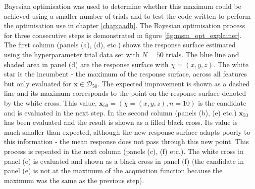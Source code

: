Bayesian optimisation was used to determine whether this maximum could be achieved using a smaller number of trials and to test the code written to perform the optimisation use in chapter \ref{chap:aadh}. The Bayesian optimisation process for three consecutive steps is demonstrated in figure \ref{fig:msm_opt_explainer}. The first column (panels (a), (d), etc.) shows the response surface estimated using the hyperparameter trial data set with $N=50$ trials. The blue line and shaded area in panel (d) are the response surface with $\chi=(x, y, z)$. The white star is the incumbent - the maximum of the response surface, across all features but only evaluated for $\mathbf{x}\in \mathcal{D}_{50}$. The expected improvement is shown as a dashed line and its maximum corresponds to the point on the response surface denoted by the white cross. This value,  $\mathbf{x}_{50} = \left(\chi=(x, y, z), n=10\right)$ is the candidate and is evaluated in the  next step. In the second column (panels (b), (e) etc.) $\mathbf{x}_{50}$ has been evaluated and the result is shown as a filled black cross. Its value is much smaller than expected, although the new response surface adapts poorly to this information - the mean response does not pass through this new point. This process is repeated in the next column (panels (c), (f) etc.). The white cross in panel (e) is evaluated and shown as a black cross in panel (f) (the candidate in panel (e) is not at the maximum of the acquisition function because the maximum  was the same as the previous step).

